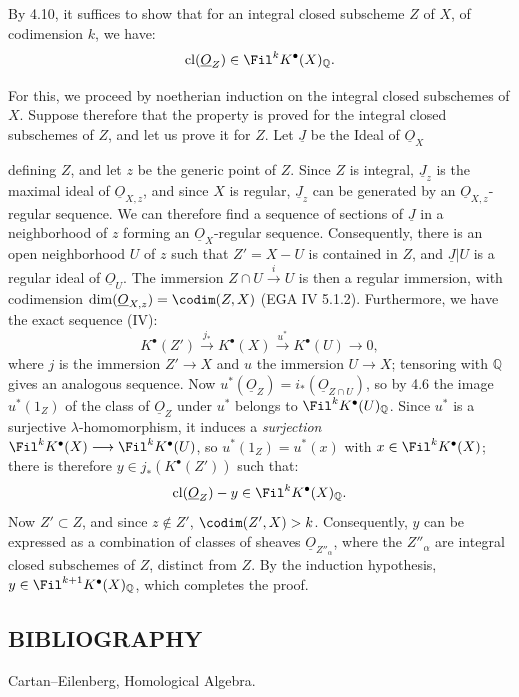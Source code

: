 By 4.10, it suffices to show that for an integral closed subscheme \(Z\) of \(X\), of codimension \(k\), we have:
\[
  \operatorname{cl}(\underline{O}_Z)\in\Fil^kK^{\bullet}(X)_{\mathbb Q}.
\]

For this, we proceed by noetherian induction on the integral closed subschemes of \(X\). Suppose therefore that the property is proved for the integral closed subschemes of \(Z\), and let us prove it for \(Z\). Let \(\underline{J}\) be the Ideal of \(\underline{O}_X\)

%
defining \(Z\), and let \(z\) be the generic point of \(Z\). Since \(Z\) is integral, \(\underline{J}_z\) is the maximal ideal of \(\underline{O}_{X,z}\), and since \(X\) is regular, \(\underline{J}_z\) can be generated by an \(\underline{O}_{X,z}\)-regular sequence. We can therefore find a sequence of sections of \(\underline{J}\) in a neighborhood of \(z\) forming an \(\underline{O}_X\)-regular sequence. Consequently, there is an open neighborhood \(U\) of \(z\) such that \(Z'=X-U\) is contained in \(Z\), and \(\underline{J}|U\) is a regular ideal of \(\underline{O}_U\). The immersion \(Z\cap U\xrightarrow{i}U\) is then a regular immersion, with codimension \(\dim(\underline{O}_{X,z})=\codim(Z,X)\) (EGA IV 5.1.2). Furthermore, we have the exact sequence (IV\qquad):
\[
  K^{\bullet}(Z')\xrightarrow{j_*}K^{\bullet}(X)
  \xrightarrow{u^*}K^{\bullet}(U)\to0,
\]
where \(j\) is the immersion \(Z'\to X\) and \(u\) the immersion \(U\to X\); tensoring with \(\mathbb Q\) gives an analogous sequence. Now \(u^*(\underline{O}_Z)=i_*(\underline{O}_{Z\cap U})\), so by 4.6 the image \(u^*(1_Z)\) of the class of \(\underline{O}_Z\) under \(u^*\) belongs to \(\Fil^kK^{\bullet}(U)_{\mathbb Q}\). Since \(u^*\) is a surjective \(\lambda\)-homomorphism, it induces a \emph{surjection} \(\Fil^kK^{\bullet}(X)\longrightarrow \Fil^kK^{\bullet}(U)\), so \(u^*(1_Z)=u^*(x)\) with \(x\in\Fil^kK^{\bullet}(X)\); there is therefore \(y\in j_*(K^{\bullet}(Z'))\) such that:
\[
  \operatorname{cl}(\underline{O}_Z)-y\in\Fil^kK^{\bullet}(X)_{\mathbb Q}.
\]
Now \(Z'\subset Z\), and since \(z\notin Z'\), \(\codim(Z',X)>k\). Consequently, \(y\) can be expressed as a combination of classes of sheaves \(\underline{O}_{Z''_\alpha}\), where the \(Z''_\alpha\) are integral closed subschemes of \(Z\), distinct from \(Z\). By the induction hypothesis, \(y\in\Fil^{k+1}K^{\bullet}(X)_{\mathbb Q}\), which completes the proof.

\subsection*{BIBLIOGRAPHY}
\begin{enumerate}[label={[\arabic*]}]
\item Cartan--Eilenberg, Homological Algebra.
\end{enumerate}



\providecommand{\etale}{\'etale}
\providecommand{\Ch}{\operatorname{Ch}}


